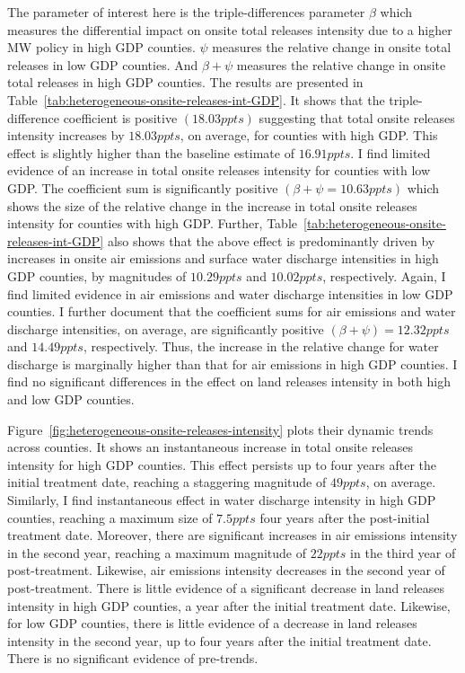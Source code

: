 \documentclass[12pt, english]{article}
\begin{document}
    The parameter of interest here is the triple-differences parameter $\beta$ which measures the differential impact on onsite total releases intensity due to a higher MW policy in high GDP counties. $\psi$ measures the relative change in onsite total releases in low GDP counties. And $\beta + \psi$ measures the relative change in onsite total releases in high GDP counties. The results are presented in Table~\ref{tab:heterogeneous-onsite-releases-int-GDP}. It shows that the triple-difference coefficient is positive $(18.03ppts)$ suggesting that total onsite releases intensity increases by $18.03ppts$, on average, for counties with high GDP. This effect is slightly higher than the baseline estimate of $16.91ppts$. I find limited evidence of an increase in total onsite releases intensity for counties with low GDP. The coefficient sum is significantly positive $(\beta + \psi = 10.63ppts)$ which shows the size of the relative change in the increase in total onsite releases intensity for counties with high GDP. Further, Table~\ref{tab:heterogeneous-onsite-releases-int-GDP} also shows that the above effect is predominantly driven by increases in onsite air emissions and surface water discharge intensities in high GDP counties, by magnitudes of $10.29ppts$ and $10.02ppts$, respectively. Again, I find limited evidence in air emissions and water discharge intensities in low GDP counties. I further document that the coefficient sums for air emissions and water discharge intensities, on average, are significantly positive $(\beta + \psi) = 12.32ppts$ and $14.49ppts$, respectively. Thus, the increase in the relative change for water discharge is marginally higher than that for air emissions in high GDP counties. I find no significant differences in the effect on land releases intensity in both high and low GDP counties.
    

    Figure~\ref{fig:heterogeneous-onsite-releases-intensity} plots their dynamic trends across counties. It shows an instantaneous increase in total onsite releases intensity for high GDP counties. This effect persists up to four years after the initial treatment date, reaching a staggering magnitude of $49ppts$, on average. Similarly, I find instantaneous effect in water discharge intensity in high GDP counties, reaching a maximum size of $7.5ppts$ four years after the post-initial treatment date. Moreover, there are significant increases in air emissions intensity in the second year, reaching a maximum magnitude of $22ppts$ in the third year of post-treatment. Likewise, air emissions intensity decreases in the second year of post-treatment. There is little evidence of a significant decrease in land releases intensity in high GDP counties, a year after the initial treatment date. Likewise, for low GDP counties, there is little evidence of a decrease in land releases intensity in the second year, up to four years after the initial treatment date. There is no significant evidence of pre-trends.
\end{document}

